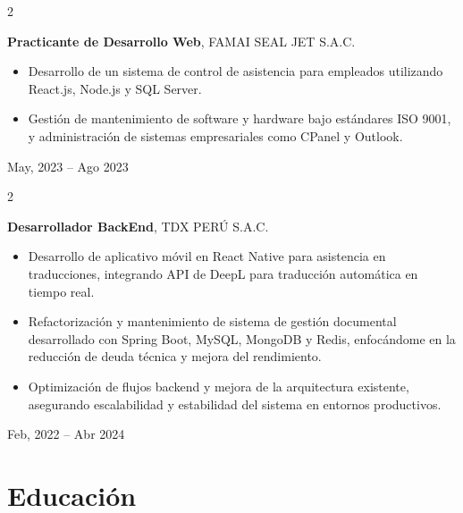 \documentclass[10pt, letterpaper]{article}
\newenvironment{highlights}{
    \begin{itemize}[
        topsep=0.10 cm,
        parsep=0.10 cm,
        partopsep=0pt,
        itemsep=0pt,
        leftmargin=0 cm + 10pt
    ]
}{
    \end{itemize}
} %
\newenvironment{twocolentry}[2][]{
    \onecolentry
    \def\secondColumn{#2}
    \setcolumnwidth{\fill, 4.5 cm}
    \begin{paracol}{2}
}{
    \switchcolumn \raggedleft \secondColumn
    \end{paracol}
    \endonecolentry
} %
\begin{document}
        \vspace{0.3 cm}

        \begin{twocolentry}{
            May, 2023 – Ago 2023
        }
            \textbf{Practicante de Desarrollo Web}, FAMAI SEAL JET S.A.C.

        \vspace{0.10 cm}
            \begin{highlights}
                \vspace{0.1 cm}
                \item Desarrollo de un sistema de control de asistencia para empleados utilizando React.js, Node.js y SQL Server.
                \item Gestión de mantenimiento de software y hardware bajo estándares ISO 9001, y administración de sistemas empresariales como CPanel y Outlook.
            \end{highlights}
        \end{twocolentry}

        \vspace{0.3 cm}
        \begin{twocolentry}{
            Feb, 2022 – Abr 2024
        }
            \textbf{Desarrollador BackEnd}, TDX PERÚ S.A.C.

        \vspace{0.10 cm}
            \begin{highlights}
                \vspace{0.1 cm}
                \item Desarrollo de aplicativo móvil en React Native para asistencia en traducciones, integrando API de DeepL para traducción automática en tiempo real.
                \item Refactorización y mantenimiento de sistema de gestión documental desarrollado con Spring Boot, MySQL, MongoDB y Redis, enfocándome en la reducción de deuda técnica y mejora del rendimiento.
                \item Optimización de flujos backend y mejora de la arquitectura existente, asegurando escalabilidad y estabilidad del sistema en entornos productivos.
            \end{highlights}
            \end{twocolentry}


    
   
    \section{Educación}
       
\end{document}

